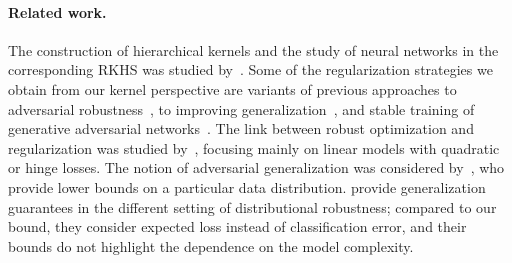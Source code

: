 \paragraph{Related work.}
The construction of hierarchical kernels and the study of neural networks in the corresponding RKHS was studied
by~\citet{mairal2016end,zhang2016l1,zhang2016convexified,bietti2018group}.
Some of the regularization strategies we obtain from our kernel perspective are variants of previous
approaches to adversarial robustness~\citep{cisse2017parseval,madry2018towards,simon2018adversarial,roth2018adversarially},
to improving generalization~\citep{drucker1991double,miyato2018virtual,sedghi2018singular,simard1998transformation,yoshida2017spectral},
and stable training of generative adversarial networks~\citep{roth2017stabilizing,gulrajani2017improved,arbel2018gradient,miyato2018spectral}.
The link between robust optimization and regularization was studied by~\citet{xu2009robust,xu2009robustness},
focusing mainly on linear models with quadratic or hinge losses.
The notion of adversarial generalization was considered by~\citet{schmidt2018adversarially},
who provide lower bounds on a particular data distribution.
\citet{sinha2018certifying} provide generalization guarantees in the different setting of distributional robustness;
compared to our bound, they consider expected loss instead of classification error, and their bounds do not highlight the dependence on
the model complexity.

